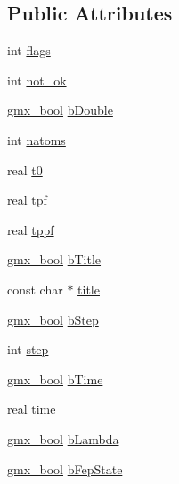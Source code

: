 \subsection*{\-Public \-Attributes}
\begin{DoxyCompactItemize}
\item 
int \hyperlink{structtrxframe_a8890e70cf6ff8410f0927f98e2550915}{flags}
\item 
int \hyperlink{structtrxframe_a1f7542abcf13442d60d76a24346e89f9}{not\-\_\-ok}
\item 
\hyperlink{include_2types_2simple_8h_a8fddad319f226e856400d190198d5151}{gmx\-\_\-bool} \hyperlink{structtrxframe_afef04a728319b9efc01cd1e393f581c7}{b\-Double}
\item 
int \hyperlink{structtrxframe_a6b328a3015d76248a5ae9474ace2954b}{natoms}
\item 
real \hyperlink{structtrxframe_ae97f99f3ee39fb083d10ee27eee920d1}{t0}
\item 
real \hyperlink{structtrxframe_a9a1d74512af66ee4d7ae9462f5726cbf}{tpf}
\item 
real \hyperlink{structtrxframe_ac0ec6124de1b1f35b471bb9c6b0c9b06}{tppf}
\item 
\hyperlink{include_2types_2simple_8h_a8fddad319f226e856400d190198d5151}{gmx\-\_\-bool} \hyperlink{structtrxframe_ae0d1f439afb637fdaf2a937efb099aa3}{b\-Title}
\item 
const char $\ast$ \hyperlink{structtrxframe_a9f6dbb6a14ab3d35a185b03d5f3cd25c}{title}
\item 
\hyperlink{include_2types_2simple_8h_a8fddad319f226e856400d190198d5151}{gmx\-\_\-bool} \hyperlink{structtrxframe_a1ec5d36c674d731788fbf7155a77fe42}{b\-Step}
\item 
int \hyperlink{structtrxframe_a8e6faa46207988274f98f9201efee8b3}{step}
\item 
\hyperlink{include_2types_2simple_8h_a8fddad319f226e856400d190198d5151}{gmx\-\_\-bool} \hyperlink{structtrxframe_a89c39036bc4d8dda8f73cd45b12a9da1}{b\-Time}
\item 
real \hyperlink{structtrxframe_a8442637d1cf2ba37a40606b663670240}{time}
\item 
\hyperlink{include_2types_2simple_8h_a8fddad319f226e856400d190198d5151}{gmx\-\_\-bool} \hyperlink{structtrxframe_a1e16df8ac1a72876368c807cdf1a47da}{b\-Lambda}
\item 
\hyperlink{include_2types_2simple_8h_a8fddad319f226e856400d190198d5151}{gmx\-\_\-bool} \hyperlink{structtrxframe_a00a885964a66025484022a45a502f973}{b\-Fep\-State}
\item 

\end{DoxyCompactItemize}
